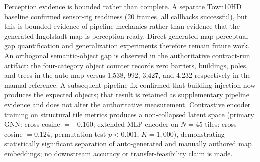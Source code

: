 Perception evidence is bounded rather than complete. A separate Town10HD baseline confirmed sensor-rig readiness (20 frames, all callbacks successful), but this is bounded evidence of pipeline mechanics rather than evidence that the generated Ingolstadt map is perception-ready. Direct generated-map perceptual gap quantification and generalization experiments therefore remain future work. An orthogonal semantic-object gap is observed in the authoritative contract-run artifact: the four-category object counter records zero barriers, buildings, poles, and trees in the auto map versus 1{,}538, 992, 3{,}427, and 4{,}232 respectively in the manual reference. A subsequent pipeline fix confirmed that building injection now produces the expected objects; that result is retained as supplementary pipeline evidence and does not alter the authoritative measurement. Contrastive encoder training on structural tile metrics produces a non-collapsed latent space (primary GNN: cross-cosine $= -0.160$; extended MLP encoder on $N\!=\!45$ tiles: cross-cosine $= 0.124$, permutation test $p<0.001$, $K\!=\!1{,}000$), demonstrating statistically significant separation of auto-generated and manually authored map embeddings; no downstream accuracy or transfer-feasibility claim is made.
